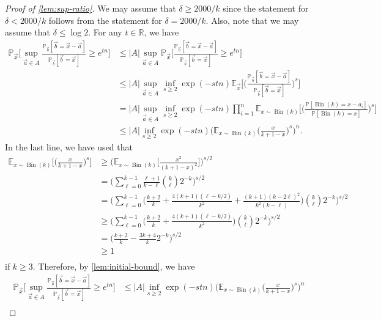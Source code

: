 \documentclass[11pt]{article}
\numberwithin{equation}{section}
\theoremstyle{definition}
\theoremstyle{remark}
\newcommand{\mb}{\mathbb}
\newcommand{\on}{\operatorname}
\begin{document}
\begin{proof}[Proof of \cref{lem:sup-ratio}]
We may assume that $\delta \ge 2000/k$ since the statement for $\delta < 2000/k$ follows from the statement for $\delta = 2000/k$. Also, note that we may assume that $\delta \le \log2$.
For any $t \in \mb{R}$, we have
\begin{align*}
\mb{P}_{\vec{x}}\bigg[\sup_{\vec{a}\in A}\frac{\mb{P}_{\vec{b}}[\vec{b} = \vec{x}-\vec{a}]}{\mb{P}_{\vec{b}}[\vec{b} = \vec{x}]}\ge e^{tn}\bigg]&\le |A|\sup_{\vec{a}\in A}\mb{P}_{\vec{x}}\bigg[\frac{\mb{P}_{\vec{b}}[\vec{b} = \vec{x}-\vec{a}]}{\mb{P}_{\vec{b}}[\vec{b} = \vec{x}]}\ge e^{tn}\bigg]\\
&\le |A|\sup_{\vec{a}\in A}\inf_{s\ge 2}\exp(-stn)\mb{E}_{\vec{x}}\bigg[\bigg(\frac{\mb{P}_{\vec{b}}[\vec{b} = \vec{x}-\vec{a}]}{\mb{P}_{\vec{b}}[\vec{b} = \vec{x}]}\bigg)^s\bigg]\\
&= |A|\sup_{\vec{a}\in A}\inf_{s\ge 2}\exp(-stn)\prod_{i=1}^n\mb{E}_{x\sim\on{Bin}(k)}\bigg[\bigg(\frac{\mb{P}[\on{Bin}(k) = x-a_i]}{\mb{P}[\on{Bin}(k) = x]}\bigg)^s\bigg]\\
&\le |A|\inf_{s\ge 2}\exp(-stn)\bigg(\mb{E}_{x\sim\on{Bin}(k)}\bigg(\frac{x}{k+1-x}\bigg)^s\bigg)^n.
\end{align*}
In the last line, we have used that
\begin{align*}
    \mb{E}_{x\sim\on{Bin}(k)}\bigg[\bigg(\frac{x}{k+1-x}\bigg)^s\bigg]
    &\ge \bigg(\mb{E}_{x\sim\on{Bin}(k)}\bigg[\frac{x^2}{(k+1-x)^2}\bigg]\bigg)^{s/2}\\
    &= \bigg(\sum_{\ell = 0}^{k-1}\frac{\ell+1}{k-\ell}\binom{k}{\ell}2^{-k}\bigg)^{s/2}\\
    &= \bigg(\sum_{\ell = 0}^{k-1}\bigg(\frac{k+2}{k} + \frac{4(k+1)(\ell-k/2)}{k^2} + \frac{(k+1)(k-2\ell)^2}{k^2(k-\ell)}\bigg)\binom{k}{\ell}2^{-k}\bigg)^{s/2}\\
    &\ge \bigg(\sum_{\ell = 0}^{k-1}\bigg(\frac{k+2}{k} + \frac{4(k+1)(\ell-k/2)}{k^2}\bigg)\binom{k}{\ell}2^{-k}\bigg)^{s/2}\\
    &=\bigg(\frac{k+2}{k}-\frac{3k+4}{k}2^{-k}\bigg)^{s/2}\\
    &\ge 1\\
\end{align*}
if $k\ge 3$.
Therefore, by \cref{lem:initial-bound}, we have
\begin{align*}
\mb{P}_{\vec{x}}\bigg[\sup_{\vec{a}\in A}\frac{\mb{P}_{\vec{b}}[\vec{b} = \vec{x}-\vec{a}]}{\mb{P}_{\vec{b}}[\vec{b} = \vec{x}]}\ge e^{tn}\bigg]&\le |A|\inf_{s\ge 2}\exp(-stn)\bigg(\mb{E}_{x\sim\on{Bin}(k)}\bigg(\frac{x}{k+1-x}\bigg)^s\bigg)^n\\

\end{align*}
\end{proof}
\end{document}
